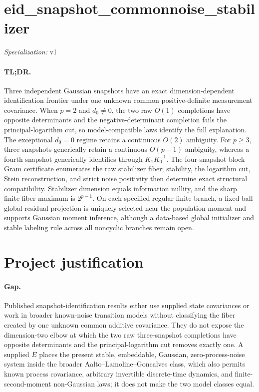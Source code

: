 \documentclass{article}
\begin{document}
\sloppy

\section*{eid\_\allowbreak{}snapshot\_\allowbreak{}commonnoise\_\allowbreak{}stabilizer}

\noindent\textit{Specialization:} v1\par

\paragraph{TL;DR.} Three independent Gaussian snapshots have an exact dimension-dependent identification frontier under one unknown common positive-definite measurement covariance.  When \(p=2\) and \(d_0\ne0\), the two raw \(O(1)\) completions have opposite determinants and the negative-determinant completion fails the principal-logarithm cut, so model-compatible laws identify the full explanation.  The exceptional \(d_0=0\) regime retains a continuous \(O(2)\) ambiguity.  For \(p\ge3\), three snapshots generically retain a continuous \(O(p-1)\) ambiguity, whereas a fourth snapshot generically identifies through \(K_1K_0^{-1}\).  The four-snapshot block Gram certificate enumerates the raw stabilizer fiber; stability, the logarithm cut, Stein reconstruction, and strict noise positivity then determine exact structural compatibility.  Stabilizer dimension equals information nullity, and the sharp finite-fiber maximum is \(2^{p-1}\).  On each specified regular finite branch, a fixed-ball global residual projection is uniquely selected near the population moment and supports Gaussian moment inference, although a data-based global initializer and stable labeling rule across all noncyclic branches remain open.

\section{Project justification}

\paragraph{Gap.} Published snapshot-identification results either use supplied state covariances or work in broader known-noise transition models without classifying the fiber created by one unknown common additive covariance.  They do not expose the dimension-two elbow at which the two raw three-snapshot completions have opposite determinants and the principal-logarithm cut removes exactly one.  A supplied \(E\) places the present stable, embeddable, Gaussian, zero-process-noise system inside the broader Aalto--Lamoline--Goncalves class, which also permits known process covariance, arbitrary invertible discrete-time dynamics, and finite-second-moment non-Gaussian laws; it does not make the two model classes equal.
\end{document}
